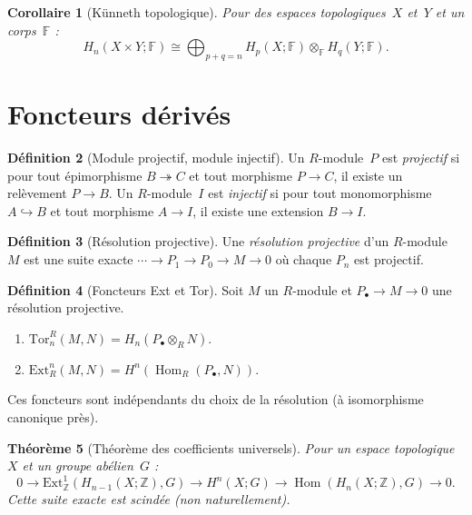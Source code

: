 \documentclass[12pt,a4paper,openany]{book}
\theoremstyle{definition}
\newtheorem{definition}{Définition}[chapter]
\theoremstyle{plain}
\newtheorem{theoreme}[definition]{Théorème}
\newtheorem{corollaire}[definition]{Corollaire}
\theoremstyle{remark}
\newcommand{\Z}{\mathbb{Z}}
\DeclareMathOperator{\Hom}{Hom}
\begin{document}
\begin{corollaire}[Künneth topologique]\label{cor:kunneth-topo}
  Pour des espaces topologiques~$X$ et~$Y$ et un corps~$\mathbb{F}$ :
  \[
    H_n(X \times Y; \mathbb{F}) \cong
    \bigoplus_{p+q=n} H_p(X; \mathbb{F}) \otimes_\mathbb{F} H_q(Y; \mathbb{F}).
  \]
\end{corollaire}

\section{Foncteurs dérivés}\label{sec:foncteurs-derives}

\begin{definition}[Module projectif, module injectif]\label{def:projectif-injectif}
  Un $R$-module~$P$ est \emph{projectif} si pour tout épimorphisme $B \twoheadrightarrow C$
  et tout morphisme $P \to C$, il existe un relèvement $P \to B$. Un
  $R$-module~$I$ est \emph{injectif} si pour tout monomorphisme $A \hookrightarrow B$
  et tout morphisme $A \to I$, il existe une extension $B \to I$.
\end{definition}

\begin{definition}[Résolution projective]\label{def:resolution-projective}
  Une \emph{résolution projective} d'un $R$-module~$M$ est une suite exacte
  $\cdots \to P_1 \to P_0 \to M \to 0$
  où chaque $P_n$ est projectif.
\end{definition}

\begin{definition}[Foncteurs Ext et Tor]\label{def:ext-tor}
  Soit $M$ un $R$-module et $P_\bullet \to M \to 0$ une résolution projective.
  \begin{enumerate}[label=(\roman*)]
    \item $\mathrm{Tor}_n^R(M, N) = H_n(P_\bullet \otimes_R N)$.
    \item $\mathrm{Ext}_R^n(M, N) = H^n(\Hom_R(P_\bullet, N))$.
  \end{enumerate}
  Ces foncteurs sont indépendants du choix de la résolution (à isomorphisme
  canonique près).
\end{definition}

\begin{theoreme}[Théorème des coefficients universels]\label{thm:coeff-universels-app}
  Pour un espace topologique~$X$ et un groupe abélien~$G$ :
  \[
    0 \to \mathrm{Ext}^1_\Z(H_{n-1}(X; \Z), G) \to H^n(X; G)
    \to \Hom(H_n(X; \Z), G) \to 0.
  \]
  Cette suite exacte est scindée (non naturellement).
\end{theoreme}
\end{document}
